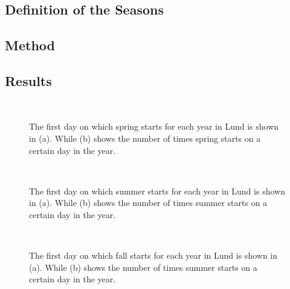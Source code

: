 

\subsection{Definition of the Seasons}

\subsection{Method}

\subsection{Results}

\begin{figure}[ht!]
\centering
{} 
\\
\caption{The first day on which spring starts for each year in Lund is shown in (a).  While (b) shows the number of times spring starts on a certain day in the year.}
\label{fig:spring}
\end{figure}

\begin{figure}[ht!]
\centering
{} 
\\
\caption{The first day on which summer starts for each year in Lund is shown in (a).  While (b) shows the number of times summer starts on a certain day in the year.}
\label{fig:summer}
\end{figure}

\begin{figure}[ht!]
\centering
{} 
\\
\caption{The first day on which fall starts for each year in Lund is shown in (a).  While (b) shows the number of times summer starts on a certain day in the year.}
\label{fig:fall}
\end{figure}

